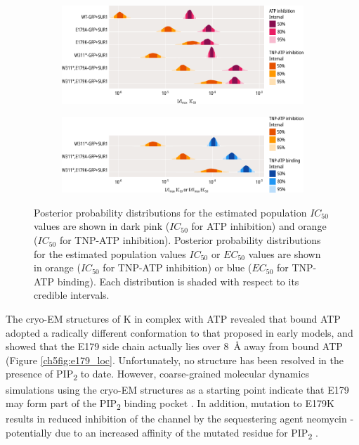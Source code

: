 \begin{figure}[hbtp]
	\centering
	\begin{subfigure}[t]{0.9\textwidth}
		\caption{}\label{ch5fig:e179_ec50_fits}
		\centering
		\includegraphics[width=\textwidth]{e179_5.pdf}
	\end{subfigure}
	\vfill
	\begin{subfigure}[t]{0.9\textwidth}
		\caption{}\label{ch5fig:e179_ec50_fits_2}
		\centering
		\includegraphics[width=\textwidth]{e179_6.pdf}
	\end{subfigure}
	\caption[E179 mutations $EC_{50}$ parameters]{
	{\bf{}}
	 Posterior probability distributions for the estimated population $IC_{50}$ values are shown in dark pink ($IC_{50}$ for ATP inhibition) and orange ($IC_{50}$ for TNP-ATP inhibition).
	 Posterior probability distributions for the estimated population values $IC_{50}$ or $EC_{50}$ values are shown in orange ($IC_{50}$ for TNP-ATP inhibition) or blue ($EC_{50}$ for TNP-ATP binding).
	Each distribution is shaded with respect to its credible intervals.
	}\label{ch5fig:e179_1a}
\end{figure}

The cryo-EM structures of K\ATP{} in complex with ATP revealed that bound ATP adopted a radically different conformation to that proposed in early models, and showed that the E179 side chain actually lies over \SI{8}{\angstrom} away from bound ATP \cite{lee_molecular_2017, martin_anti-diabetic_2017, li_structure_2017, puljung_cryo-electron_2018-1} (Figure \ref{ch5fig:e179_loc}.
Unfortunately, no structure has been resolved in the presence of PIP\textsubscript{2} to date.
However, coarse-grained molecular dynamics simulations using the cryo-EM structures as a starting point indicate that E179 may form part of the PIP\textsubscript{2} binding pocket \cite{pipatpolkai_evaluating_2020}.
In addition, mutation to E179K results in reduced inhibition of the channel by the sequestering agent neomycin - potentially due to an increased affinity of the mutated residue for PIP\textsubscript{2} \cite{pipatpolkai_evaluating_2020}.

